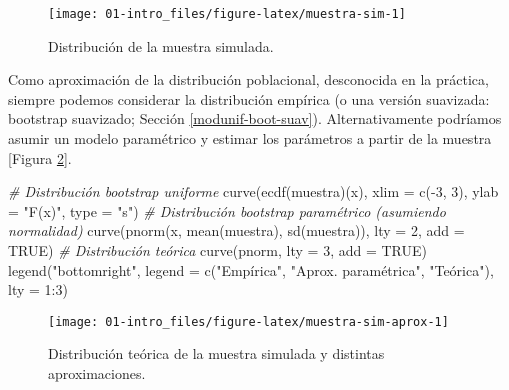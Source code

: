 \documentclass[
]{book}
\newenvironment{Shaded}{\begin{snugshade}}{\end{snugshade}}
\newcommand{\AttributeTok}[1]{\textcolor[rgb]{0.77,0.63,0.00}{#1}}
\newcommand{\CommentTok}[1]{\textcolor[rgb]{0.56,0.35,0.01}{\textit{#1}}}
\newcommand{\ConstantTok}[1]{\textcolor[rgb]{0.00,0.00,0.00}{#1}}
\newcommand{\DecValTok}[1]{\textcolor[rgb]{0.00,0.00,0.81}{#1}}
\newcommand{\FunctionTok}[1]{\textcolor[rgb]{0.00,0.00,0.00}{#1}}
\newcommand{\NormalTok}[1]{#1}
\newcommand{\SpecialCharTok}[1]{\textcolor[rgb]{0.00,0.00,0.00}{#1}}
\newcommand{\StringTok}[1]{\textcolor[rgb]{0.31,0.60,0.02}{#1}}
\theoremstyle{break}
\theoremstyle{definition}
\theoremstyle{definition}
\theoremstyle{definition}
\theoremstyle{definition}
\theoremstyle{remark}
\begin{document}
\begin{figure}[!htb]

{\centering \texttt{[image: 01-intro\_files/figure-latex/muestra-sim-1]} 

}

\caption{Distribución de la muestra simulada.}\label{fig:muestra-sim}
\end{figure}

Como aproximación de la distribución poblacional, desconocida en la práctica,
siempre podemos considerar la distribución empírica
(o una versión suavizada: bootstrap suavizado; Sección \ref{modunif-boot-suav}).
Alternativamente podríamos asumir un modelo paramétrico y estimar los parámetros a partir de la muestra {[}Figura \ref{fig:muestra-sim-aprox}{]}.

\begin{Shaded}
\begin{Highlighting}[]
\CommentTok{\# Distribución bootstrap uniforme}
\FunctionTok{curve}\NormalTok{(}\FunctionTok{ecdf}\NormalTok{(muestra)(x), }\AttributeTok{xlim =} \FunctionTok{c}\NormalTok{(}\SpecialCharTok{{-}}\DecValTok{3}\NormalTok{, }\DecValTok{3}\NormalTok{), }\AttributeTok{ylab =} \StringTok{"F(x)"}\NormalTok{, }\AttributeTok{type =} \StringTok{"s"}\NormalTok{)}
\CommentTok{\# Distribución bootstrap paramétrico (asumiendo normalidad)}
\FunctionTok{curve}\NormalTok{(}\FunctionTok{pnorm}\NormalTok{(x, }\FunctionTok{mean}\NormalTok{(muestra), }\FunctionTok{sd}\NormalTok{(muestra)), }\AttributeTok{lty =} \DecValTok{2}\NormalTok{, }\AttributeTok{add =} \ConstantTok{TRUE}\NormalTok{)}
\CommentTok{\# Distribución teórica}
\FunctionTok{curve}\NormalTok{(pnorm, }\AttributeTok{lty =} \DecValTok{3}\NormalTok{, }\AttributeTok{add =} \ConstantTok{TRUE}\NormalTok{)}
\FunctionTok{legend}\NormalTok{(}\StringTok{"bottomright"}\NormalTok{, }\AttributeTok{legend =} \FunctionTok{c}\NormalTok{(}\StringTok{"Empírica"}\NormalTok{, }\StringTok{"Aprox. paramétrica"}\NormalTok{, }\StringTok{"Teórica"}\NormalTok{), }\AttributeTok{lty =} \DecValTok{1}\SpecialCharTok{:}\DecValTok{3}\NormalTok{)}
\end{Highlighting}
\end{Shaded}

\begin{figure}[!htb]

{\centering \texttt{[image: 01-intro\_files/figure-latex/muestra-sim-aprox-1]} 

}

\caption{Distribución teórica de la muestra simulada y distintas aproximaciones.}\label{fig:muestra-sim-aprox}
\end{figure}
\end{document}

